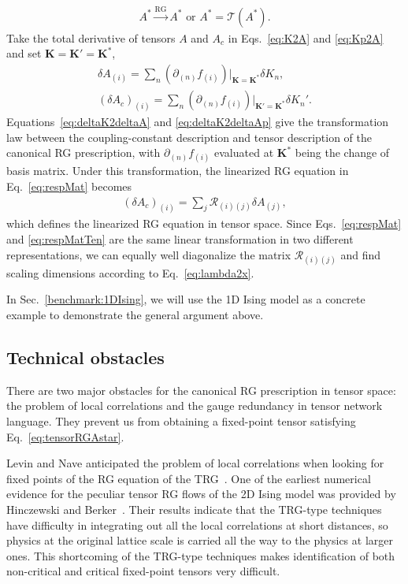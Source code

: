 \documentclass[aps,prr,reprint,superscriptaddress,nofootinbib,floatfix]{revtex4-2}
\begin{document}
%
\begin{align}\label{eq:tensorRGAstar}
    A^* \xrightarrow{\text{RG}} A^* \text{ or }A^* = \mathcal{T}\left(A^* \right).
\end{align}
%
Take the total derivative of tensors $A$ and $A_c$ in Eqs.~\eqref{eq:K2A} and \eqref{eq:Kp2A} and set $\mathbf{K} = \mathbf{K}' = \mathbf{K}^*$, 
%
\begin{align}
    \delta A_{(i)} = \sum_n \left(\partial_{(n)}
    f_{(i)}\right)\Bigr|_{\mathbf{K} = \mathbf{K}^*} \delta K_n,
    \label{eq:deltaK2deltaA} \\
    \left(\delta A_c \right)_{(i)} = \sum_n \left(\partial_{(n)}
    f_{(i)}\right)\Bigr|_{\mathbf{K}' = \mathbf{K}^*} \delta
    K_n'.\label{eq:deltaK2deltaAp}
\end{align}
%
Equations~\eqref{eq:deltaK2deltaA} and \eqref{eq:deltaK2deltaAp} give the transformation law between the coupling-constant description and tensor description of the canonical RG prescription, with $\partial_{(n)}f_{(i)}$ evaluated at $\mathbf{K}^*$ being the change of basis matrix.
Under this transformation, the linearized RG equation in Eq.~\eqref{eq:respMat} becomes
%
\begin{align}\label{eq:respMatTen}
    \left(\delta A_c\right)_{(i)} = \sum_j
    \mathcal{R}_{(i)(j)} \delta A_{(j)},
\end{align}
%
which defines the linearized RG equation in tensor space.
Since Eqs.~\eqref{eq:respMat} and \eqref{eq:respMatTen} are the same linear transformation in two different representations, we can equally well diagonalize the matrix $\mathcal{R}_{(i)(j)}$ and find scaling dimensions according to Eq.~\eqref{eq:lambda2x}. 
%

In Sec.~\ref{benchmark:1DIsing}, we will use the 1D Ising model as a
concrete example to demonstrate the general argument above.
%

\subsection{Technical obstacles\label{sec:obstacles}}
There are two major obstacles for the canonical RG prescription in tensor space: the problem of local correlations and the gauge redundancy in tensor network language. 
They prevent us from obtaining a fixed-point tensor satisfying Eq.~\eqref{eq:tensorRGAstar}.
%

Levin and Nave anticipated the problem of local correlations when looking for fixed points of the RG equation of the TRG~\cite{LevinTalk}.
One of the earliest numerical evidence for the peculiar tensor RG flows of the 2D Ising model was provided by Hinczewski and Berker~\cite{Berker2008}. 
Their results indicate that the TRG-type techniques have difficulty in integrating out all the local correlations at short distances, so physics at the original lattice scale is carried all the way to the physics at larger ones. 
This shortcoming of the TRG-type techniques makes identification of both non-critical and critical fixed-point tensors very difficult.
%
\end{document}

